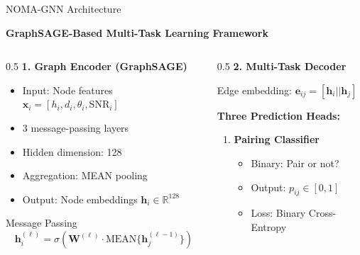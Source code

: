 \documentclass[aspectratio=169]{beamer}
\begin{document}
\begin{frame}{NOMA-GNN Architecture}
    \begin{center}
        \textbf{GraphSAGE-Based Multi-Task Learning Framework}
    \end{center}
    
    \vspace{0.3cm}
    
    \begin{columns}
        \begin{column}{0.5\textwidth}
            \textbf{1. Graph Encoder (GraphSAGE)}
            \begin{itemize}
                \item Input: Node features $\mathbf{x}_i = [h_i, d_i, \theta_i, \text{SNR}_i]$
                \item 3 message-passing layers
                \item Hidden dimension: 128
                \item Aggregation: MEAN pooling
                \item Output: Node embeddings $\mathbf{h}_i \in \mathbb{R}^{128}$
            \end{itemize}
            
            \vspace{0.2cm}
            
            \begin{block}{Message Passing}
                \small
                \begin{equation*}
                    \mathbf{h}_i^{(\ell)} = \sigma\left( \mathbf{W}^{(\ell)} \cdot \text{MEAN}\{\mathbf{h}_j^{(\ell-1)}\} \right)
                \end{equation*}
            \end{block}
        \end{column}
        \begin{column}{0.5\textwidth}
            \textbf{2. Multi-Task Decoder}
            
            Edge embedding: $\mathbf{e}_{ij} = [\mathbf{h}_i || \mathbf{h}_j]$
            
            \vspace{0.2cm}
            
            \textbf{Three Prediction Heads:}
            \begin{enumerate}
                \item \textbf{Pairing Classifier}
                \begin{itemize}
                    \item Binary: Pair or not?
                    \item Output: $p_{ij} \in [0,1]$
                    \item Loss: Binary Cross-Entropy
                \end{itemize}
                

\end{enumerate}
\end{column}
\end{columns}
\end{frame}
\end{document}
